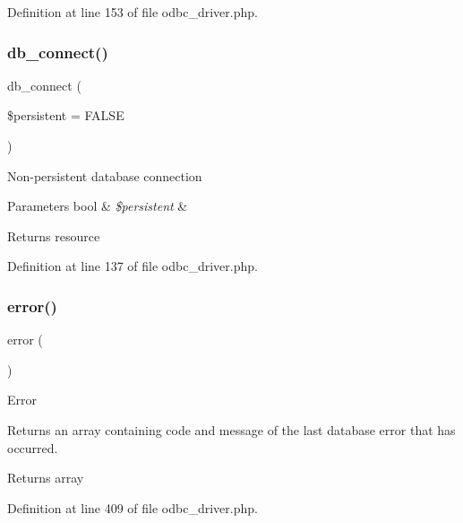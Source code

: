 Definition at line 153 of file odbc\+\_\+driver.\+php.

\mbox{\label{class_c_i___d_b__odbc__driver_a52bf595e79e96cc0a7c907a9b45aeb4d}} 
\subsubsection{\texorpdfstring{db\_connect()}{db\_connect()}}
{\footnotesize\ttfamily db\+\_\+connect (\begin{DoxyParamCaption}\item[{}]{\$persistent = {\ttfamily FALSE} }\end{DoxyParamCaption})}

Non-\/persistent database connection


\begin{DoxyParams}[1]{Parameters}
bool & {\em \$persistent} & \\
\hline
\end{DoxyParams}
\begin{DoxyReturn}{Returns}
resource 
\end{DoxyReturn}


Definition at line 137 of file odbc\+\_\+driver.\+php.

\mbox{\label{class_c_i___d_b__odbc__driver_a43b8d30b879d4f09ceb059b02af2bc02}} 
\subsubsection{\texorpdfstring{error()}{error()}}
{\footnotesize\ttfamily error (\begin{DoxyParamCaption}{ }\end{DoxyParamCaption})}

Error

Returns an array containing code and message of the last database error that has occurred.

\begin{DoxyReturn}{Returns}
array 
\end{DoxyReturn}


Definition at line 409 of file odbc\+\_\+driver.\+php.

